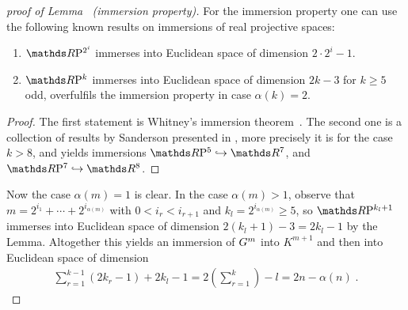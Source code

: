 \begin{proof}[proof of
  Lemma~
  (immersion property)]
  For the immersion property one can use the following known
  results on immersions of real projective spaces:
  \begin{Lem}
    \begin{enumerate}
    \item
      $\RP{2^i}$ immerses into Euclidean space of dimension
      $2\cdot2^i-1$.
    \item
      $\RP{k}$ immerses into Euclidean space of dimension
      $2k-3$ for $k\geq 5$ odd, \idest overfulfils the immersion
      property in case $\alpha(k)=2$.
    \end{enumerate}
    \begin{proof}
      The first statement is Whitney's immersion
      theorem~\cite{whitneyimmersiontheorem}.
      The second one is a collection of results by Sanderson
      presented in \cite{sanderson}, more precisely it is
      \cite[Theorem~(5.3)]{sanderson} for the case $k>8$, and
      \cite[Theorem~(4.1)]{sanderson} yields immersions
      $\RP 5\immto\R^7$, and $\RP 7\immto\R^8$.
    \end{proof}
  \end{Lem}
  Now the case $\alpha(m)=1$ is clear.
  In the case $\alpha(m)>1$, observe that
  $m=2^{i_1}+\dotsb +2^{i_{\alpha(m)}}$ with $0<i_r< i_{r+1}$ and
  $k_l=2^{i_{\alpha(m)}}\geq 5$, so $\RP{k_l+1}$ immerses into
  Euclidean space of dimension $2(k_l+1)-3=2k_l-1$ by the Lemma.
  Altogether this yields an immersion of $G^{m}$ into $K^{m+1}$ and
  then into Euclidean space of dimension
  \begin{gather*}
    \sum_{r=1}^{k-1}(2k_r-1) + 2k_l-1
    = 2\left(\sum_{r=1}^{k}\right) - l
    = 2n - \alpha(n)
    \;.
  \end{gather*}
\end{proof}
